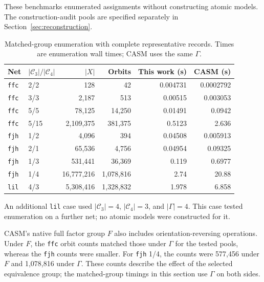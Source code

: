 \documentclass[a5paper, 10pt]{article}
\begin{document}
These benchmarks enumerated assignments without constructing atomic models. The construction-audit pools are specified separately in Section~\ref{sec:reconstruction}.

\begin{table}[H]
\centering\scriptsize
\setlength{\tabcolsep}{1.2mm}
\caption{Matched-group enumeration with complete representative records. Times are enumeration wall times; CASM uses the same $\Gamma$.}
\label{tab:matched_extra}
\begin{tabular}{llrrrr}
\toprule
Net & $|\mathcal C_3|/|\mathcal C_4|$ & $|X|$ & Orbits & This work (s) & CASM (s) \\
\midrule
\texttt{ffc} & 2/2 & 128 & 42 & 0.004731 & 0.0002792 \\
\texttt{ffc} & 3/3 & 2,187 & 513 & 0.00515 & 0.003053 \\
\texttt{ffc} & 5/5 & 78,125 & 14,250 & 0.01491 & 0.0942 \\
\texttt{ffc} & 5/15 & 2,109,375 & 381,375 & 0.5123 & 2.636 \\
\texttt{fjh} & 1/2 & 4,096 & 394 & 0.04508 & 0.005913 \\
\texttt{fjh} & 2/1 & 65,536 & 4,756 & 0.04954 & 0.09325 \\
\texttt{fjh} & 1/3 & 531,441 & 36,369 & 0.119 & 0.6977 \\
\texttt{fjh} & 1/4 & 16,777,216 & 1,078,816 & 2.74 & 20.88 \\
\texttt{lil} & 4/3 & 5,308,416 & 1,328,832 & 1.978 & 6.858 \\
\bottomrule
\end{tabular}
\end{table}

An additional \texttt{lil} case used $|\mathcal C_3|=4$, $|\mathcal C_4|=3$, and $|\Gamma|=4$. This case tested enumeration on a further net; no atomic models were constructed for it.

CASM's native full factor group $F$ also includes orientation-reversing operations. Under $F$, the \texttt{ffc} orbit counts matched those under $\Gamma$ for the tested pools, whereas the \texttt{fjh} counts were smaller. For \texttt{fjh} 1/4, the counts were 577,456 under $F$ and 1,078,816 under $\Gamma$. These counts describe the effect of the selected equivalence group; the matched-group timings in this section use $\Gamma$ on both sides.
\end{document}
